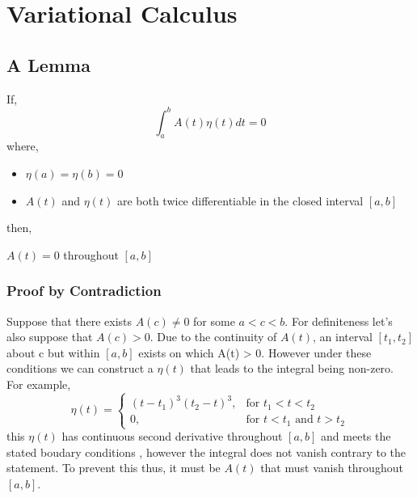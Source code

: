 \section{Variational Calculus}
\subsection{A Lemma}
If,
\begin{equation}
    \int_{a}^{b}A(t)\eta(t)dt =0
\end{equation}
where,
\begin{itemize}
    \item $\eta(a) = \eta(b) = 0$
    \item $A(t)$ and $\eta(t)$ are both twice differentiable in the closed interval $[a,b]$ 
\end{itemize}
then,
\begin{tcolorbox}
$A(t) = 0$ throughout $[a,b]$
\end{tcolorbox}
\subsubsection{Proof by Contradiction}
Suppose that there exists $A(c) \neq 0$ for some $a < c < b$. For definiteness let's also suppose that $A(c) > 0$. Due to the continuity of $A(t)$, an interval $[t_{1},t_{2}]$ about c but within $[a,b]$ exists on which A(t) > 0. However under these conditions we can construct a $\eta(t)$ that leads to the integral being non-zero. For example,
\begin{equation} \label{deltadef}
\eta(t) =  
\begin{cases}
{(t-t_{1})}^{3}{(t_{2}-t)}^{3}, & \text{for } t_{1} < t < t_{2}\\
0, & \text{for } t < t_{1} \text{ and } t > t_{2}
\end{cases}
\end{equation}
this $\eta(t)$ has continuous second derivative throughout $[a,b]$ and meets the stated boudary conditions , however the integral does not vanish contrary to the statement. To prevent this thus, it must be $A(t)$ that must vanish throughout $[a,b]$.

